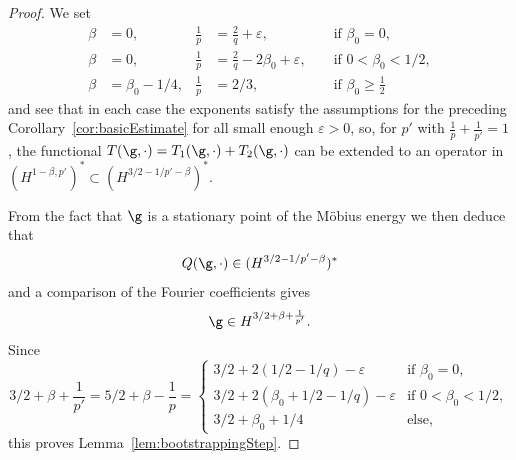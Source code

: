 \begin{proof}
 We set
\begin{align*}
  \beta & =0, & \frac 1p &= \frac 2 q + \varepsilon, & & \text { if } \beta_0 =0, \\
  \beta &=0,& \frac 1 p &= \frac 2 q - 2\beta_0 + \varepsilon,& &\text{ if } 0< \beta_0 < 1/2, \\
  \beta &= \beta_0 - 1/4,& \frac 1 p&=2/3, & & \text{ if } \beta_0 \geq \frac 1 2
\end{align*}
 and see that in each case the exponents satisfy the assumptions for the
 preceding Corollary~\ref{cor:basicEstimate}
 for all small enough $\varepsilon >0$, so,
 for $p'$ with $\frac 1 p + \frac 1 {p'} =1$, the functional
 $T(\g,\cdot) = T_1(\g,\cdot) + T_2(\g,\cdot)$
 can be extended to an operator in 
 $\left(H^{1-\beta, p'}\right)^{\ast} \subset (H^{3/2-1/{p'}-\beta})^\ast$.
 
From the fact that $\g$ is a stationary point of the M\"obius energy we then deduce that
 \begin{equation*}
    Q(\g,\cdot) \in  (H^{3/2-1/{p'}-\beta})^\ast
 \end{equation*}
 and a comparison of the Fourier coefficients gives
 \begin{equation*}
  \g \in H^{3/2+\beta + \frac 1 {p'}}.
 \end{equation*}
Since
\begin{equation*}
 3/2+ \beta + \frac 1 {p'} = 5/2 + \beta - \frac 1 p  = 
\begin{cases} 
  3/2 + 2 (1/2-1/q)-\varepsilon &\text{if } \beta_0=0, \\
  3/2 + 2(\beta_0 + 1/2-1/q)  - \varepsilon &\text{if } 0< \beta_0 < 1 /2, \\
  3/2 + \beta_0 + 1/4 &\text{else},
\end{cases}
\end{equation*}
this proves Lemma~\ref{lem:bootstrappingStep}.
\end{proof}

